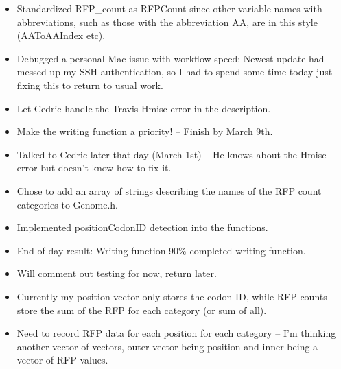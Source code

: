 \documentclass[12pt,hyperref]{labbook}
\begin{document}

\begin{itemize}
    \item Standardized RFP\_count as RFPCount since other variable names with abbreviations, such as those with the abbreviation AA, are in this style (AAToAAIndex etc).
\end{itemize}


\begin{itemize}
    \item Debugged a personal Mac issue with workflow speed: Newest update had messed up my SSH authentication, so I had to spend some time today just fixing this to return to usual work.
\end{itemize}


\begin{itemize}
    \item Let Cedric handle the Travis Hmisc error in the description.
    \item Make the writing function a priority! -- Finish by March 9th.
    \item Talked to Cedric later that day (March 1st) -- He knows about the Hmisc error but doesn't know how to fix it.
\end{itemize}


\begin{itemize}
    \item Chose to add an array of strings describing the names of the RFP count categories to Genome.h.
    \item Implemented positionCodonID detection into the functions.
    \item End of day result: Writing function 90\% completed writing function.
    \item Will comment out testing for now, return later.
    \item Currently my position vector only stores the codon ID, while RFP counts store the sum of the RFP for each category (or sum of all).
    \item Need to record RFP data for each position for each category -- I'm thinking another vector of vectors, outer vector being position and inner being a vector of RFP values.
\end{itemize}

\end{document}
